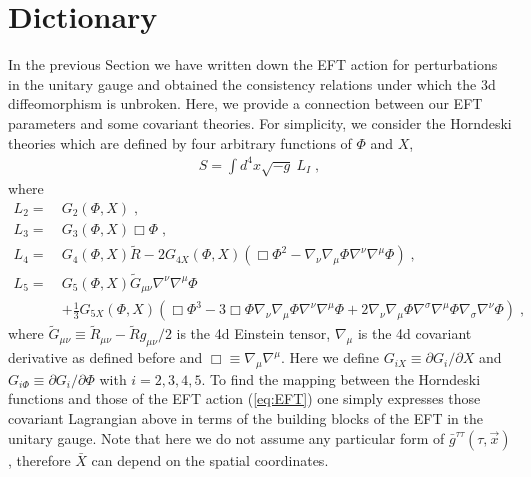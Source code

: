 \documentclass[a4paper,11pt]{article}
\numberwithin{equation}{section}
\begin{document}
\section{Dictionary}\label{sec:Dictionary}
In the previous Section we have written down the EFT action for perturbations in the unitary gauge and obtained the consistency relations under which the 3d diffeomorphism is unbroken. Here, we provide a connection between our EFT parameters and some covariant theories. For simplicity, we consider the Horndeski theories \cite{Horndeski:1974wa,Deffayet:2009mn} which are defined by four arbitrary functions of $\Phi$ and $X$,
\begin{align}\label{eq:Horndeski}
S = \int d^4x \sqrt{-g}~L_I \;,
\end{align}
where
\begin{align}
L_2 =~&G_2(\Phi,X) \;, \\
L_3 =~&G_3(\Phi,X) \Box\Phi \;, \label{eq:cubic_Horn} \\
L_4 =~&G_4(\Phi,X)\tilde{R} - 2 G_{4X}(\Phi,X) (\Box\Phi^2 - \nabla_\nu\nabla_\mu\Phi \nabla^\nu\nabla^\mu\Phi) \;, \label{eq:L_4_Horna} \\
L_5 =~&G_5(\Phi,X) \tilde{G}_{\mu\nu} \nabla^\nu\nabla^\mu\Phi \nonumber \\ &+ \frac{1}{3}G_{5X}(\Phi,X)(\Box \Phi^3 - 3 \Box\Phi \nabla_\nu\nabla_\mu\Phi \nabla^\nu\nabla^\mu\Phi + 2 \nabla_\nu\nabla_\mu\Phi \nabla^\sigma \nabla^\mu \Phi \nabla_\sigma \nabla^\nu \Phi) \;, \label{eq:L_5}
\end{align}
where $\tilde{G}_{\mu\nu} \equiv \tilde{R}_{\mu\nu} - \tilde{R}g_{\mu\nu}/2$ is the 4d Einstein tensor, $\nabla_\mu$ is the 4d covariant derivative as defined before and $\Box \equiv \nabla_\mu\nabla^\mu$. Here we define $G_{iX} \equiv \partial G_i/\partial X$ and $G_{i\Phi} \equiv \partial G_i/\partial \Phi$ with $i = 2,3,4,5$. To find the mapping between the Horndeski functions and those of the EFT action (\ref{eq:EFT}) one simply expresses those covariant Lagrangian above in terms of the building blocks of the EFT in the unitary gauge.  Note that here we do not assume any particular form of $\bar{g}^{\tau\tau}(\tau,\vec{x})$, therefore $\bar{X}$ can depend on the spatial coordinates. 
\end{document}
